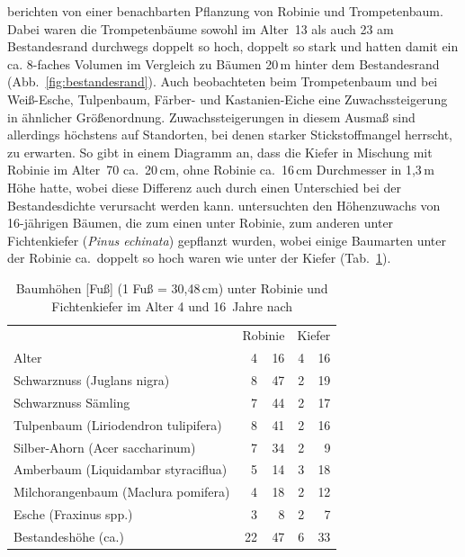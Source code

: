 \documentclass[twocolumn]{scrartcl}
\begin{document}
\citet{ferguson1922robinie,mcintyre1932robinie,chapman1935robinie}
berichten von einer benachbarten Pflanzung von Robinie und
Trompetenbaum. Dabei waren die Trompetenbäume sowohl im Alter~13 als
auch 23 am Bestandesrand durchwegs doppelt so hoch, doppelt so stark
und hatten damit ein ca. 8-faches Volumen im Vergleich zu Bäumen 20\,m
hinter dem Bestandesrand (Abb.~\ref{fig:bestandesrand}). Auch
\citet{mcintyre1932robinie} beobachteten beim Trompetenbaum und
\citet{chapman1935robinie} bei Weiß-Esche, Tulpenbaum, Färber- und
Kastanien-Eiche eine Zuwachssteigerung in ähnlicher
Größenordnung. Zuwachssteigerungen in diesem Ausmaß sind allerdings
höchstens auf Standorten, bei denen starker Stickstoffmangel herrscht,
zu erwarten. So gibt \citet[S.~107]{krauss1986sauenerWald} in einem
Diagramm an, dass die Kiefer in Mischung mit Robinie im Alter~70
ca.\ 20\,cm, ohne Robinie ca.\ 16\,cm Durchmesser in 1,3\,m Höhe
hatte, wobei diese Differenz auch durch einen Unterschied bei der
Bestandesdichte verursacht werden
kann. \citet{ashby1986robinieWuchssteigerung} untersuchten den
Höhenzuwachs von 16-jährigen Bäumen, die zum einen unter Robinie, zum
anderen unter Fichtenkiefer (\emph{Pinus echinata}) gepflanzt wurden,
wobei einige Baumarten unter der Robinie ca.\ doppelt so hoch waren
wie unter der Kiefer (Tab.~\ref{tab:zuwachsUnterbau}).

\begin{table}[htbp]
  \centering
  \begin{tabular}{lrr|rr}
    & \multicolumn{2}{c|}{Robinie} & \multicolumn{2}{c}{Kiefer} \\
    Alter & 4 & 16 & 4 & 16\\
    \hline
    Schwarznuss (Juglans nigra)          &  8 & 47 & 2 & 19 \\
    Schwarznuss Sämling                  &  7 & 44 & 2 & 17 \\
    Tulpenbaum (Liriodendron tulipifera) &  8 & 41 & 2 & 16 \\
    Silber-Ahorn (Acer saccharinum)      &  7 & 34 & 2 & 9 \\
    Amberbaum (Liquidambar styraciflua)  &  5 & 14 & 3 & 18 \\
    Milchorangenbaum (Maclura pomifera)  &  4 & 18 & 2 & 12 \\
    Esche (Fraxinus spp.)                &  3 &  8 & 2 & 7 \\
    Bestandeshöhe (ca.)                  & 22 & 47 & 6 & 33 \\
  \end{tabular}%
  \caption{Baumhöhen [Fuß] (1 Fuß = 30,48\,cm) unter Robinie und Fichtenkiefer im Alter 4 und 16~Jahre nach \citet{ashby1986robinieWuchssteigerung}}
  \label{tab:zuwachsUnterbau}
\end{table}
\end{document}

